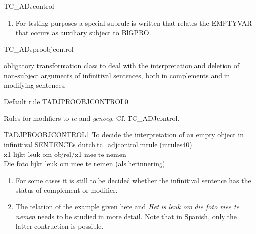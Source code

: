 \begin{mruleclass}{TC\_ADJcontrol}
\begin{members}
\begin{member}
\begin{enumerate}
  \item
For testing purposes a special subrule is written that 
relates the EMPTYVAR that occurs as auxiliary subject to BIGPRO.
\end{enumerate}

\end{member}

\end{members}
\end{mruleclass}

\begin{mruleclass}{TC\_ADJproobjcontrol}
\begin{classdescr}
\kind obligatory transformation class
\classtask to deal with the interpretation and deletion of non-subject arguments
of 
infinitival sentences, both in complements and in modifying sentences.

\classremarks

\nofilters

\nospeedrules

\begin{plannedrules}
\item
Default rule TADJPROOBJCONTROL0
\item
Rules for modifiers to {\em te} and {\em genoeg}. Cf. TC\_ADJcontrol.
\end{plannedrules}

\norulesnotince

\end{classdescr}

\begin{members}

\begin{member}
 TADJPROOBJCONTROL1
 To decide the interpretation of an empty object in infinitival 
SENTENCEs
\file dutch:tc\_adjcontrol.mrule (mrules40)
\semantics \nosemantics
\example\mbox{}\\
x1  lijkt leuk om  objrel/x1 mee te nemen\\
Die foto lijkt  leuk om mee te nemen (als herinnering)
\remarks\mbox{}
\begin{enumerate}
\item 
For some cases it is still to be decided whether the infinitival sentence 
has the status of complement or modifier.
\item
The relation of the example given here and {\em Het is leuk om die foto 
mee te nemen} needs to be studied in more detail. Note that in Spanish,
only the latter contruction is possible.
\end{enumerate}
\end{member}
\end{members}

\end{mruleclass}
